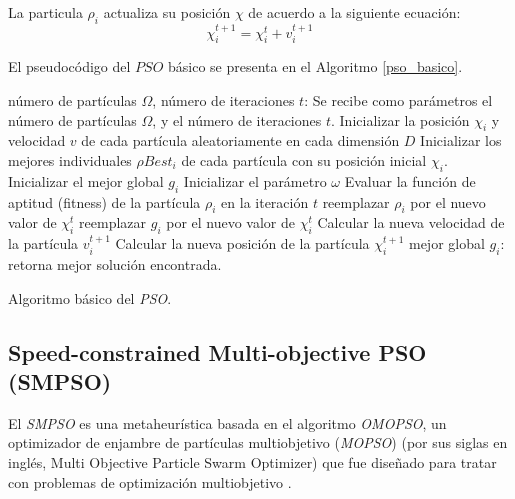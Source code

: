 La particula $\rho_i$ actualiza su posición $\chi$ de acuerdo a la siguiente ecuación:
\begin{equation}\label{posicion}
    \chi^{t+1}_i = \chi^{t}_i + v^{t+1}_i
\end{equation}

El pseudocódigo del $PSO$ básico se presenta en el Algoritmo \ref{pso_basico}.

\begin{algorithm}[hbpt]
    \begin{algorithmic}[1]
    \REQUIRE número de partículas $\Omega$, número de iteraciones $t$: Se recibe como parámetros el número de partículas $\Omega$, y el número de iteraciones $t$.
    \STATE Inicializar la posición $\chi_i$ y velocidad $v$ de cada partícula aleatoriamente en cada dimensión $D$
    \STATE Inicializar los mejores individuales $\rho{Best_i}$ de cada partícula con su posición inicial $\chi_i$.
    \STATE Inicializar el mejor global $g_i$
    \STATE Inicializar el parámetro $\omega$
            \STATE Evaluar la función de aptitud (fitness) de la partícula $\rho_i$ en la iteración $t$
                \STATE reemplazar $\rho_i$ por el nuevo valor de $\chi^t_i$
            \ENDIF
                \STATE reemplazar $g_i$ por el nuevo valor de $\chi^t_i$
            \ENDIF
            \STATE Calcular la nueva velocidad de la partícula $v^{t+1}_i$
            \STATE Calcular la nueva posición de la partícula $\chi^{t+1}_i$
        \ENDFOR
    \ENDWHILE
    \RETURN mejor global $g_i$: retorna mejor solución encontrada.
    \end{algorithmic}
    \caption{Algoritmo básico del \textit{PSO}.}
    \label{pso_basico}
\end{algorithm} \break

\subsection{Speed-constrained Multi-objective PSO (SMPSO)}
\label{sec:smpso}

El \textit{SMPSO} es una metaheurística basada en el algoritmo \textit{OMOPSO}, un optimizador de enjambre de partículas multiobjetivo (\textit{MOPSO}) (por sus siglas en inglés, Multi Objective Particle Swarm Optimizer) que fue diseñado para tratar con problemas de optimización multiobjetivo \cite{RC05}. 

